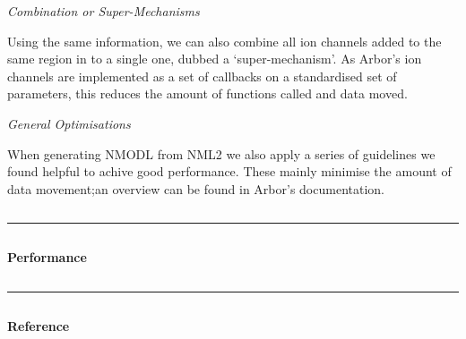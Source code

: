 \documentclass{beamer}
\begin{document}
\begin{frame}[t, fragile]
\begin{columns}
\begin{column}{0.49\textwidth}
      \vspace*{1ex}
      \emph{Combination or Super-Mechanisms}

      Using the same information, we can also combine all ion channels added to
      the same region in to a single one, dubbed a `super-mechanism'. As Arbor's
      ion channels are implemented as a set of callbacks on a standardised set
      of parameters, this reduces the amount of functions called and data moved.

      \vspace*{1ex}
      \emph{General Optimisations}

      When generating NMODL from NML2 we also apply a series of guidelines we
      found helpful to achive good performance. These mainly minimise the amount
      of data movement;\@ an overview can be found in Arbor's documentation.
    \end{column}
  \end{columns}
  \vspace*{1ex}
  \textcolor{arborange}{\rule{\textwidth}{0.5ex}}
  \vspace*{-1ex}
  \begin{columns}
    \begin{column}{0.49\textwidth}
      \textbf{Performance}
    \end{column}
  \end{columns}
  \vspace*{1ex}
  \textcolor{arbred}{\rule{\textwidth}{0.5ex}}
  \vspace*{-1ex}
  \begin{columns}
    \begin{column}{0.49\textwidth}
      \textbf{Reference}
    \end{column}
  \end{columns}

\end{frame}
\end{document}
